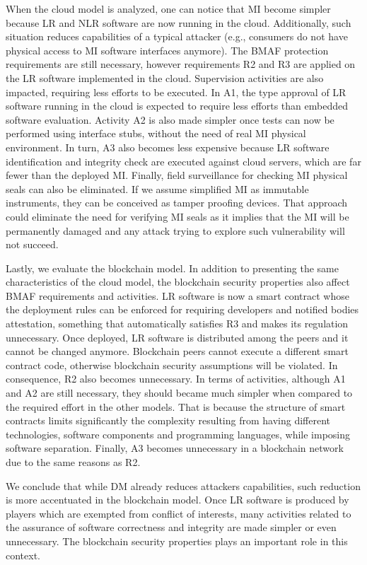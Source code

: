 \documentclass[journal]{IEEEtran}
\begin{document}
When the cloud model is analyzed, one can notice that MI become simpler because LR and NLR software are now running in the cloud. 
Additionally, such situation reduces capabilities of a typical attacker (e.g., consumers do not have physical access to MI software interfaces anymore).
The BMAF protection requirements are still necessary, however requirements R2 and R3 are applied on the LR software implemented in the cloud. 
Supervision activities are also impacted, requiring less efforts to be executed. 
In A1, the type approval of LR software running in the cloud is expected to require less efforts than embedded software evaluation. 
Activity A2 is also made simpler once tests can now be performed using interface stubs, without the need of real MI physical environment. 
In turn, A3 also becomes less expensive because LR software identification and integrity check are executed against cloud servers, which are far fewer than the deployed MI. 
Finally, field surveillance for checking MI physical seals can also be eliminated. 
If we assume simplified MI as immutable instruments, they can be conceived as tamper proofing devices. 
That approach could eliminate the need for verifying MI seals as it implies that the MI will be permanently damaged and any attack trying to explore such vulnerability will not succeed.

Lastly, we evaluate the blockchain model. 
In addition to presenting the same characteristics of the cloud model, the blockchain security properties also affect BMAF requirements and activities. 
LR software is now a smart contract whose the deployment rules can be enforced for requiring developers and notified bodies attestation, something that automatically satisfies R3 and makes its regulation unnecessary.
Once deployed, LR software is distributed among the peers and it cannot be changed anymore.
Blockchain peers cannot execute a different smart contract code, otherwise blockchain security assumptions will be violated.
In consequence, R2 also becomes unnecessary. In terms of activities, although A1 and A2 are still necessary, they should became much simpler when compared to the required effort in the other models.
That is because the structure of smart contracts limits significantly the complexity resulting from having different technologies, software components and programming languages, while imposing software separation.
Finally, A3 becomes unnecessary in a blockchain network due to the same reasons as R2.

We conclude that while DM already reduces attackers capabilities, such reduction is more accentuated in the blockchain model. 
Once LR software is produced by players which are exempted from conflict of interests, many activities related to the assurance of software correctness and integrity are made simpler or even unnecessary. 
The blockchain security properties plays an important role in this context. 
\end{document}
